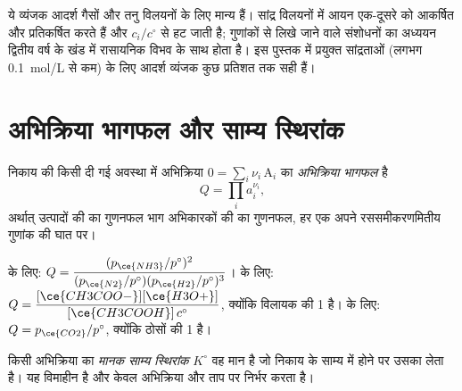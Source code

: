 \begin{remark}[आदर्श और वास्तविक]\label{rem:b1:extent-q-and-k:ideal}
ये व्यंजक आदर्श गैसों और तनु विलयनों के लिए मान्य हैं।
सांद्र विलयनों में आयन एक-दूसरे को आकर्षित और प्रतिकर्षित करते हैं और
 $c_i/c^\circ$ से हट जाती है;  गुणांकों से लिखे जाने वाले संशोधनों
का अध्ययन द्वितीय वर्ष के खंड में रासायनिक
विभव के साथ होता है। इस पुस्तक में प्रयुक्त सांद्रताओं (लगभग
\qty{0.1}{mol/L} से कम) के लिए आदर्श व्यंजक कुछ प्रतिशत तक सही हैं।
\end{remark}

\section{अभिक्रिया भागफल और साम्य स्थिरांक}

\begin{definition}[अभिक्रिया भागफल]\label{def:b1:extent-q-and-k:quotient}
निकाय की किसी दी गई अवस्था में अभिक्रिया
$0 = \sum_i \nu_i\,\mathrm{A}_i$ का \emph{अभिक्रिया भागफल} है
\[
  Q = \prod_i a_i^{\nu_i} ,
\]
अर्थात् उत्पादों की  का गुणनफल भाग अभिकारकों की  का गुणनफल, हर एक
अपने रससमीकरणमितीय गुणांक की घात पर।
\end{definition}

\begin{example}[तीन भागफल]\label{ex:b1:extent-q-and-k:quotients}
 के लिए: $Q = \dfrac{(p_{\ce{NH3}}/p^\circ)^2}
{(p_{\ce{N2}}/p^\circ)(p_{\ce{H2}}/p^\circ)^3}$।
 के लिए: $Q =
\dfrac{[\ce{CH3COO-}][\ce{H3O+}]}{[\ce{CH3COOH}]\,c^\circ}$, क्योंकि विलायक
की  1 है।  के लिए: $Q =
p_{\ce{CO2}}/p^\circ$, क्योंकि ठोसों की  1 है।
\end{example}

\begin{definition}[मानक साम्य स्थिरांक]\label{def:b1:extent-q-and-k:equilibrium-constant}
किसी अभिक्रिया का \emph{मानक साम्य स्थिरांक}
$K^\circ$ वह मान है जो निकाय के साम्य में होने पर उसका  लेता है। यह विमाहीन है और
केवल अभिक्रिया और ताप पर निर्भर करता है।
\end{definition}

